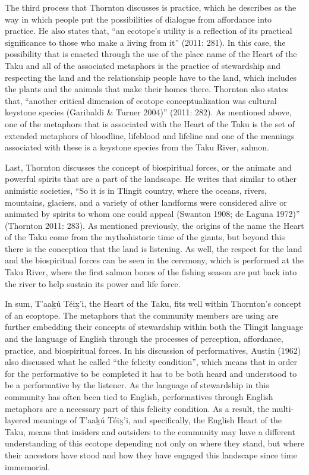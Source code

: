 The third process that Thornton discusses is practice, which he describes as the way in which people put the possibilities of dialogue from affordance into practice. He also states that, “an ecotope’s utility is a reflection of its practical significance to those who make a living from it” (2011: 281). In this case, the possibility that is enacted through the use of the place name of the Heart of the Taku and all of the associated metaphors is the practice of stewardship and respecting the land and the relationship people have to the land, which includes the plants and the animals that make their homes there. Thornton also states that, “another critical dimension of ecotope conceptualization was cultural keystone species (Garibaldi \& Turner 2004)” (2011: 282). As mentioned above, one of the metaphors that is associated with the Heart of the Taku is the set of extended metaphors of bloodline, lifeblood and lifeline and one of the meanings associated with these is a keystone species from the Taku River, salmon.

Last, Thornton discusses the concept of biospiritual forces, or the animate and powerful spirits that are a part of the landscape. He writes that similar to other animistic societies, “So it is in Tlingit country, where the oceans, rivers, mountains, glaciers, and a variety of other landforms were considered alive or animated by spirits to whom one could appeal (Swanton 1908; de Laguna 1972)” (Thornton 2011: 283). As mentioned previously, the origins of the name the Heart of the Taku come from the mythohistoric time of the giants, but beyond this there is the conception that the land is listening. As well, the respect for the land and the biospiritual forces can be seen in the ceremony, which is performed at the Taku River, where the first salmon bones of the fishing season are put back into the river to help sustain its power and life force.

In sum, T'aak̲ú Téix̲'i, the Heart of the Taku, fits well within Thornton’s concept of an ecoptope. The metaphors that the community members are using are further embedding their concepts of stewardship within both the Tlingit language and the language of English through the processes of perception, affordance, practice, and biospiritual forces. In his discussion of performatives, Austin (1962) also discussed what he called “the felicity condition”, which means that in order for the performative to be completed it has to be both heard and understood to be a performative by the listener. As the language of stewardship in this community has often been tied to English, performatives through English metaphors are a necessary part of this felicity condition. As a result, the multi-layered meanings of T'aak̲ú Téix̲'i, and specifically, the English Heart of the Taku, means that insiders and outsiders to the community may have a different understanding of this ecotope depending not only on where they stand, but where their ancestors have stood and how they have engaged this landscape since time immemorial.




